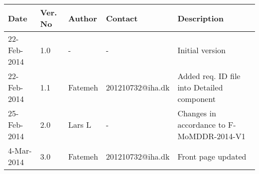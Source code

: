 \begin{center}
    \begin{tabular}{ | l | p{1cm} | l | l | p{5cm} |}
    \hline
    Date&Ver. No & Author &Contact &Description\\ \hline
	22-Feb-2014&1.0 & - & - & Initial version\\
    	22-Feb-2014&1.1 & Fatemeh & 201210732@iha.dk & Added req. ID file into Detailed component \\
    25-Feb-2014&2.0 & Lars L & - & Changes in accordance to F-MoMDDR-2014-V1\\
    4-Mar-2014&3.0 & Fatemeh & 201210732@iha.dk & Front page updated\\
    \hline
    \end{tabular}
\end{center}